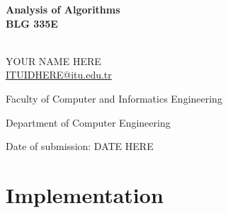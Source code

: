 \documentclass[12pt]{report}
\author{Mustafa Izzet Mustu}
\numberwithin{figure}{chapter}
\begin{document}
\begin{titlepage}
\begin{center}
    \vspace*{-3cm}
    
    \vspace{2.3cm}
    

    \vspace{1cm}
    {\textbf{Analysis of Algorithms\\}}
    \vspace{0.3cm}
    {\textbf{BLG 335E\\}}
    \vspace{2.4cm}
    
    {}\\
    YOUR NAME HERE \\ \href{mailto:ITUIDHERE@itu.edu.tr}{ITUIDHERE@itu.edu.tr}\\
    \vspace{0.9cm}

\end{center}
{\raggedleft\vfill{\begin{singlespace}
     Faculty of Computer and Informatics Engineering\\
\end{singlespace}
 Department of Computer Engineering\\
 \begin{singlespace}
 Date of submission: DATE HERE\\
 
 
 \end{singlespace}
}\par
}
\end{titlepage}

\newpage

\chapter{Implementation}
 
\end{document}
